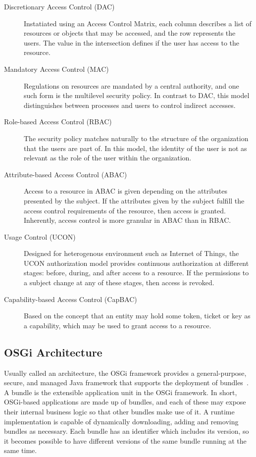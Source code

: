 \documentclass[12pt]{article}
\begin{document}
\begin{description}
\item[Discretionary Access Control (DAC)] Instatiated using an Access Control Matrix, each column describes a list of resources or objects that may be accessed, and the row represents the users. The value in the intersection defines if the user has access to the resource.
\item[Mandatory Access Control (MAC)] Regulations on resources are mandated by a central authority, and one such form is the multilevel security policy. In contrast to DAC, this model distinguishes between processes and users to control indirect accesses.
\item[Role-based Access Control (RBAC)] The security policy matches naturally to the structure of the organization that the users are part of. In this model, the identity of the user is not as relevant as the role of the user within the organization.
\item[Attribute-based Access Control (ABAC)] Access to a resource in ABAC is given depending on the attributes presented by the subject. If the attributes given by the subject fulfill the access control requirements of the resource, then access is granted. Inherently, access control is more granular in ABAC than in RBAC.
\item[Usage Control (UCON)] Designed for heterogenous environment such as Internet of Things, the UCON authorization model provides continuous authorization at different stages: before, during, and after access to a resource. If the permissions to a subject change at any of these stages, then access is revoked. 
\item[Capability-based Access Control (CapBAC)] Based on the concept that an entity may hold some token, ticket or key as a capability, which may be used to grant access to a resource. 
\end{description}

\subsection{OSGi Architecture}

Usually called an architecture, the OSGi framework provides a general-purpose, secure, and managed Java framework that supports the deployment of bundles~\cite{osgi_core}. A bundle is the extensible application unit in the OSGi framework. In short, OSGi-based applications are made up of bundles, and each of these may expose their internal business logic so that other bundles make use of it. A runtime implementation is capable of dynamically downloading, adding and removing bundles as necessary. Each bundle has an identifier which includes its version, so it becomes possible to have different versions of the same bundle running at the same time. 
\end{document}

